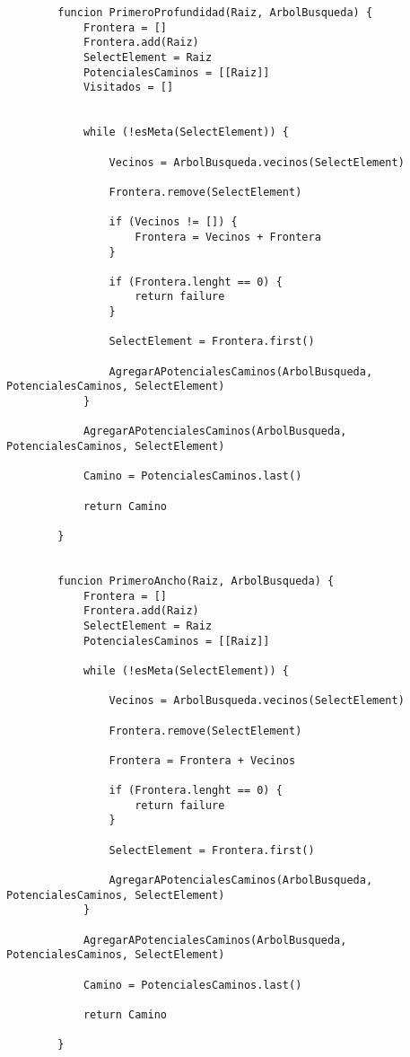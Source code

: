 \begin{center}
	\begin{lstlisting}
		funcion PrimeroProfundidad(Raiz, ArbolBusqueda) {
			Frontera = []
			Frontera.add(Raiz)
			SelectElement = Raiz
			PotencialesCaminos = [[Raiz]]
			Visitados = []
			
			
			while (!esMeta(SelectElement)) {
				
				Vecinos = ArbolBusqueda.vecinos(SelectElement)
				
				Frontera.remove(SelectElement)
				
				if (Vecinos != []) {
					Frontera = Vecinos + Frontera			
				}
				
				if (Frontera.lenght == 0) {
					return failure
				}
				
				SelectElement = Frontera.first()
				
				AgregarAPotencialesCaminos(ArbolBusqueda, PotencialesCaminos, SelectElement)
			}
			
			AgregarAPotencialesCaminos(ArbolBusqueda, PotencialesCaminos, SelectElement)
			
			Camino = PotencialesCaminos.last()
			
			return Camino
			
		}


		funcion PrimeroAncho(Raiz, ArbolBusqueda) {
			Frontera = []
			Frontera.add(Raiz)
			SelectElement = Raiz
			PotencialesCaminos = [[Raiz]]
			
			while (!esMeta(SelectElement)) {
				
				Vecinos = ArbolBusqueda.vecinos(SelectElement)
				
				Frontera.remove(SelectElement)
				
				Frontera = Frontera	+ Vecinos
				
				if (Frontera.lenght == 0) {
					return failure
				}
				
				SelectElement = Frontera.first()
				
				AgregarAPotencialesCaminos(ArbolBusqueda, PotencialesCaminos, SelectElement)
			}
			
			AgregarAPotencialesCaminos(ArbolBusqueda, PotencialesCaminos, SelectElement)
			
			Camino = PotencialesCaminos.last()
			
			return Camino
			
		}
	
	\end{lstlisting}
\end{center}


